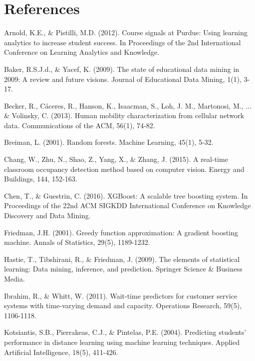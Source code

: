 \documentclass[12pt,letterpaper]{article}
\begin{document}
\section{References}

\begin{thebibliography}{99}

 Arnold, K.E., \& Pistilli, M.D. (2012). Course signals at Purdue: Using learning analytics to increase student success. In Proceedings of the 2nd International Conference on Learning Analytics and Knowledge.

 Baker, R.S.J.d., \& Yacef, K. (2009). The state of educational data mining in 2009: A review and future visions. Journal of Educational Data Mining, 1(1), 3-17.

 Becker, R., Cáceres, R., Hanson, K., Isaacman, S., Loh, J. M., Martonosi, M., ... \& Volinsky, C. (2013). Human mobility characterization from cellular network data. Communications of the ACM, 56(1), 74-82.

 Breiman, L. (2001). Random forests. Machine Learning, 45(1), 5-32.

 Chang, W., Zhu, N., Shao, Z., Yang, X., \& Zhang, J. (2015). A real-time classroom occupancy detection method based on computer vision. Energy and Buildings, 144, 152-163.

 Chen, T., \& Guestrin, C. (2016). XGBoost: A scalable tree boosting system. In Proceedings of the 22nd ACM SIGKDD International Conference on Knowledge Discovery and Data Mining.

 Friedman, J.H. (2001). Greedy function approximation: A gradient boosting machine. Annals of Statistics, 29(5), 1189-1232.

 Hastie, T., Tibshirani, R., \& Friedman, J. (2009). The elements of statistical learning: Data mining, inference, and prediction. Springer Science \& Business Media.

 Ibrahim, R., \& Whitt, W. (2011). Wait-time predictors for customer service systems with time-varying demand and capacity. Operations Research, 59(5), 1106-1118.

 Kotsiantis, S.B., Pierrakeas, C.J., \& Pintelas, P.E. (2004). Predicting students' performance in distance learning using machine learning techniques. Applied Artificial Intelligence, 18(5), 411-426.


\end{thebibliography}
\end{document}
